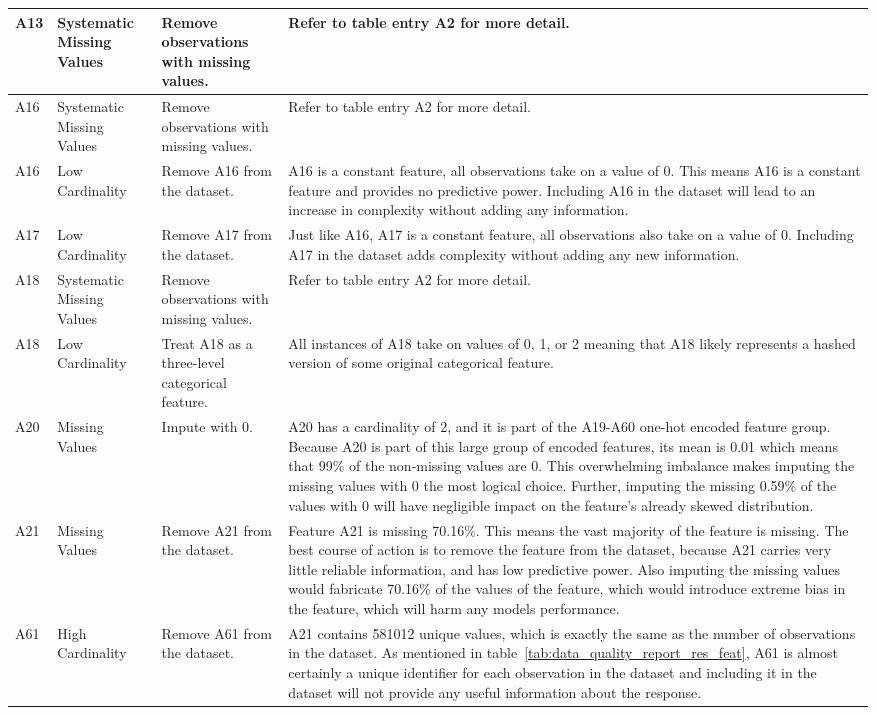 \documentclass[11pt]{report}
\begin{document}
\begin{longtable}{lp{4cm}p{4cm}p{5cm}}
\midrule
A13 & Systematic Missing Values & Remove observations with missing values. & Refer to table entry A2 for more detail. \\
\midrule
A16 & Systematic Missing Values & Remove observations with missing values. & Refer to table entry A2 for more detail. \\
\midrule
A16 & Low Cardinality & Remove A16 from the dataset. & A16 is a constant feature, all observations take on a value of 0. This means A16 is a constant feature and provides no predictive power. Including A16 in the dataset will lead to an increase in complexity without adding any information. \\
\midrule
A17 & Low Cardinality & Remove A17 from the dataset. & Just like A16, A17 is a constant feature, all observations also take on a value of 0. Including A17 in the dataset adds complexity without adding any new information. \\
\midrule
A18 & Systematic Missing Values & Remove observations with missing values. & Refer to table entry A2 for more detail. \\
\midrule
A18 & Low Cardinality & Treat A18 as a three-level categorical feature. & All instances of A18 take on values of 0, 1, or 2 meaning that A18 likely represents a hashed version of some original categorical feature. \\
\midrule
A20 & Missing Values & Impute with 0. & A20 has a cardinality of 2, and it is part of the A19-A60 one-hot encoded feature group. Because A20 is part of this large group of encoded features, its mean is 0.01 which means that 99\% of the non-missing values are 0. This overwhelming imbalance makes imputing the missing values with 0 the most logical choice. Further, imputing the missing 0.59\% of the values with 0 will have negligible impact on the feature's already skewed distribution. \\
\midrule
A21 & Missing Values & Remove A21 from the dataset. & Feature A21 is missing 70.16\%. This means the vast majority of the feature is missing. The best course of action is to remove the feature from the dataset, because A21 carries very little reliable information, and has low predictive power. Also imputing the missing values would fabricate 70.16\% of the values of the feature, which would introduce extreme bias in the feature, which will harm any models performance. \\
\midrule
A61 & High Cardinality & Remove A61 from the dataset. & A21 contains 581012 unique values, which is exactly the same as the number of observations in the dataset. As mentioned in table~\ref{tab:data_quality_report_res_feat}, A61 is almost certainly a unique identifier for each observation in the dataset and including it in the dataset will not provide any useful information about the response. \\

\end{longtable}
\end{document}
